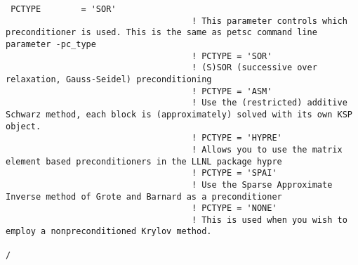 \documentclass[12pt]{amsart}
\begin{document}
\begin{verbatim}
 PCTYPE        = 'SOR'
                                     ! This parameter controls which  preconditioner is used. This is the same as petsc command line parameter -pc_type
                                     ! PCTYPE = 'SOR'
                                     ! (S)SOR (successive over relaxation, Gauss-Seidel) preconditioning
                                     ! PCTYPE = 'ASM'
                                     ! Use the (restricted) additive Schwarz method, each block is (approximately) solved with its own KSP object.
                                     ! PCTYPE = 'HYPRE'
                                     ! Allows you to use the matrix element based preconditioners in the LLNL package hypre
                                     ! PCTYPE = 'SPAI'
                                     ! Use the Sparse Approximate Inverse method of Grote and Barnard as a preconditioner
                                     ! PCTYPE = 'NONE'
                                     ! This is used when you wish to employ a nonpreconditioned Krylov method.

/
\end{verbatim}
\end{document}
